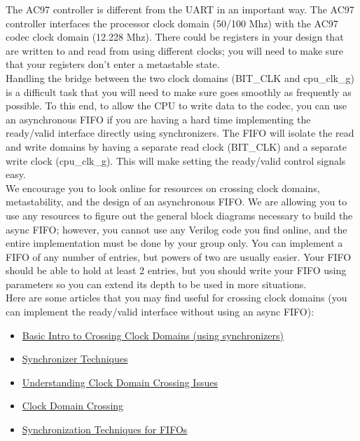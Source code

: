 \documentclass[11pt]{article}
\begin{document}
The AC97 controller is different from the UART in an important way. The AC97 controller interfaces the processor clock domain (50/100 Mhz) with the AC97 codec clock domain (12.228 Mhz). There could be registers in your design that are written to and read from using different clocks; you will need to make sure that your registers don't enter a metastable state.\\

Handling the bridge between the two clock domains (BIT\_CLK and cpu\_clk\_g) is a difficult task that you will need to make sure goes smoothly as frequently as possible. To this end, to allow the CPU to write data to the codec, you can use an asynchronous FIFO if you are having a hard time implementing the ready/valid interface directly using synchronizers. The FIFO will isolate the read and write domains by having a separate read clock (BIT\_CLK) and a separate write clock (cpu\_clk\_g). This will make setting the ready/valid control signals easy.\\

We encourage you to look online for resources on crossing clock domains, metastability, and the design of an asynchronous FIFO. We are allowing you to use any resources to figure out the general block diagrams necessary to build the async FIFO; however, you cannot use any Verilog code you find online, and the entire implementation must be done by your group only. You can implement a FIFO of any number of entries, but powers of two are usually easier. Your FIFO should be able to hold at least 2 entries, but you should write your FIFO using parameters so you can extend its depth to be used in more situations.\\

Here are some articles that you may find useful for crossing clock domains (you can implement the ready/valid interface without using an async FIFO):
\begin{itemize}
	\item \href{http://www.asic-world.com/tidbits/clock_domain.html}{Basic Intro to Crossing Clock Domains (using synchronizers)}
	\item \href{http://www.edn.com/electronics-blogs/day-in-the-life-of-a-chip-designer/4435339/Synchronizer-techniques-for-multi-clock-domain-SoCs}{Synchronizer Techniques}
	\item \href{http://www.eetimes.com/document.asp?doc_id=1279906}{Understanding Clock Domain Crossing Issues}
	\item \href{https://filebox.ece.vt.edu/~athanas/4514/ledadoc/html/pol_cdc.html}{Clock Domain Crossing}
	\item \href{http://www.eng.utah.edu/~kstevens/6770/reports/09-fifo-synchronization.pdf}{Synchronization Techniques for FIFOs}
\end{itemize}
\end{document}
